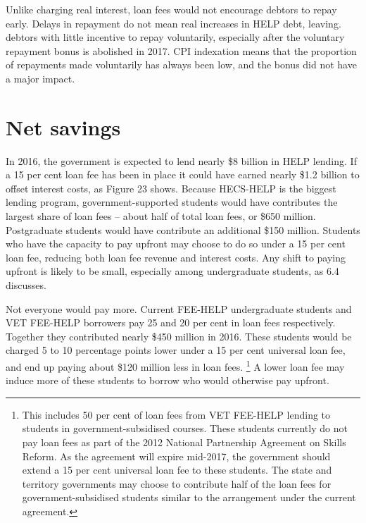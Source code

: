\documentclass[embargoed]{grattan}
\begin{document}
Unlike charging real interest, loan fees would not encourage debtors to repay early.
Delays in repayment do not mean real increases in HELP debt, leaving. debtors with little incentive to repay voluntarily, especially after the voluntary repayment bonus is abolished in 2017.
\gls{CPI} indexation means that the proportion of repayments made voluntarily has always been low, and the bonus did not have a major impact.

\section{Net savings}\label{net-savings}

In 2016, the government is expected to lend nearly \$8 billion in HELP lending.
If a 15 per cent loan fee has been in place it could have earned nearly \$1.2 billion to offset interest costs, as Figure 23 shows.
Because HECS-HELP is the biggest lending program, government-supported students would have contributes the largest share of loan fees -- about half of total loan fees, or \$650 million.
Postgraduate students would have contribute an additional \$150 million.
Students who have the capacity to pay upfront may choose to do so under a 15 per cent loan fee, reducing both loan fee revenue and interest costs.
Any shift to paying upfront is likely to be small, especially among undergraduate students, as 6.4 discusses.

Not everyone would pay more.
Current FEE-HELP undergraduate students and VET FEE-HELP borrowers pay 25 and 20 per cent in loan fees respectively.
Together they contributed nearly \$450 million in 2016.
These students would be charged 5 to 10 percentage points lower under a 15 per cent universal loan fee, and end up paying about \$120 million less in loan fees.%
\footnote{This includes 50 per cent of loan fees from VET FEE-HELP lending to students in government-subsidised courses.
These students currently do not pay loan fees as part of the 2012 National Partnership Agreement on Skills Reform.
As the agreement will expire mid-2017, the government should extend a 15 per cent universal loan fee to these students.
The state and territory governments may choose to contribute half of the loan fees for government-subsidised students similar to the arrangement under the current agreement.} A lower loan fee may induce more of these students to borrow who would otherwise pay upfront.
\end{document}
